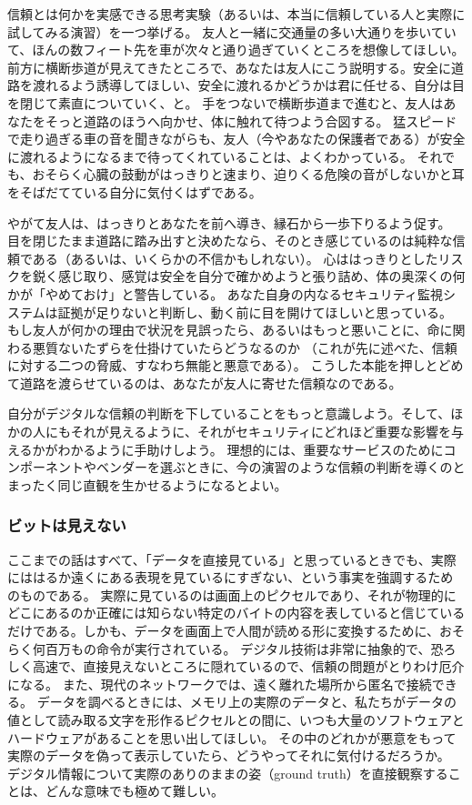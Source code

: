 \documentclass[uplatex]{jsarticle}
\def\label#1{}%
\begin{document}
\begin{exa}[目を閉じて道路を渡る思考実験]\label{exa:ch1-crossing-road}
信頼とは何かを実感できる思考実験（あるいは、本当に信頼している人と実際に試してみる演習）を一つ挙げる。
友人と一緒に交通量の多い大通りを歩いていて、ほんの数フィート先を車が次々と通り過ぎていくところを想像してほしい。
前方に横断歩道が見えてきたところで、あなたは友人にこう説明する。安全に道路を渡れるよう誘導してほしい、安全に渡れるかどうかは君に任せる、自分は目を閉じて素直についていく、と。
手をつないで横断歩道まで進むと、友人はあなたをそっと道路のほうへ向かせ、体に触れて待つよう合図する。
猛スピードで走り過ぎる車の音を聞きながらも、友人（今やあなたの保護者である）が安全に渡れるようになるまで待ってくれていることは、よくわかっている。
それでも、おそらく心臓の鼓動がはっきりと速まり、迫りくる危険の音がしないかと耳をそばだてている自分に気付くはずである。

やがて友人は、はっきりとあなたを前へ導き、縁石から一歩下りるよう促す。
目を閉じたまま道路に踏み出すと決めたなら、そのとき感じているのは純粋な信頼である（あるいは、いくらかの不信かもしれない）。
心ははっきりとしたリスクを鋭く感じ取り、感覚は安全を自分で確かめようと張り詰め、体の奥深くの何かが「やめておけ」と警告している。
あなた自身の内なるセキュリティ監視システムは証拠が足りないと判断し、動く前に目を開けてほしいと思っている。
もし友人が何かの理由で状況を見誤ったら、あるいはもっと悪いことに、命に関わる悪質ないたずらを仕掛けていたらどうなるのか
（これが先に述べた、信頼に対する二つの脅威、すなわち無能と悪意である）。
こうした本能を押しとどめて道路を渡らせているのは、あなたが友人に寄せた信頼なのである。
\end{exa}

自分がデジタルな信頼の判断を下していることをもっと意識しよう。そして、ほかの人にもそれが見えるように、それがセキュリティにどれほど重要な影響を与えるかがわかるように手助けしよう。
理想的には、重要なサービスのためにコンポーネントやベンダーを選ぶときに、今の演習のような信頼の判断を導くのとまったく同じ直観を生かせるようになるとよい。

\subsubsection{ビットは見えない}

ここまでの話はすべて、「データを直接見ている」と思っているときでも、実際にははるか遠くにある表現を見ているにすぎない、という事実を強調するためのものである。
実際に見ているのは画面上のピクセルであり、それが物理的にどこにあるのか正確には知らない特定のバイトの内容を表していると信じているだけである。しかも、データを画面上で人間が読める形に変換するために、おそらく何百万もの命令が実行されている。
デジタル技術は非常に抽象的で、恐ろしく高速で、直接見えないところに隠れているので、信頼の問題がとりわけ厄介になる。
また、現代のネットワークでは、遠く離れた場所から匿名で接続できる。
データを調べるときには、メモリ上の実際のデータと、私たちがデータの値として読み取る文字を形作るピクセルとの間に、いつも大量のソフトウェアとハードウェアがあることを思い出してほしい。
その中のどれかが悪意をもって実際のデータを偽って表示していたら、どうやってそれに気付けるだろうか。
デジタル情報について実際のありのままの姿（ground truth）を直接観察することは、どんな意味でも極めて難しい。
\end{document}
